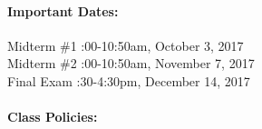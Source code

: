 \documentclass[11pt, a4paper]{article}
\begin{document}
\paragraph{Important Dates:}
\begin{center} \begin{minipage}{3.8in}
\begin{flushleft}
Midterm \#1      :00-10:50am, October 3, 2017  \\
Midterm \#2      :00-10:50am, November 7, 2017\\
Final Exam       :30-4:30pm, December 14, 2017\\
\end{flushleft}
\end{minipage}
\end{center}

\paragraph{Class Policies:}  
\end{document}

